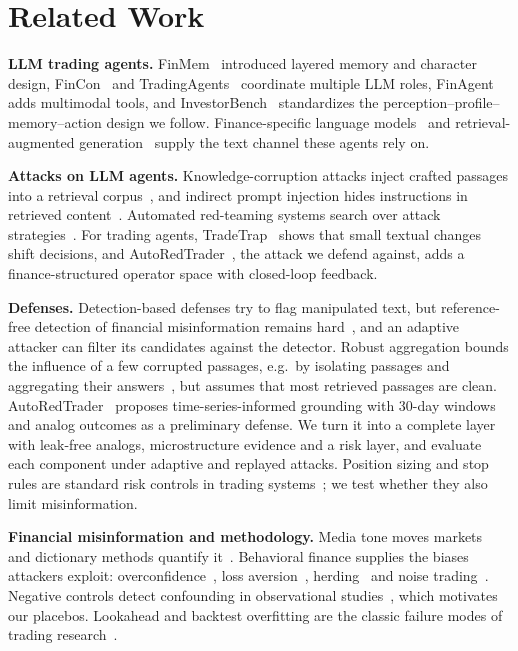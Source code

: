 \section{Related Work}\label{sec:related}
\textbf{LLM trading agents.} FinMem~\cite{yu2025finmem} introduced layered memory and character design, FinCon~\cite{yu2024fincon} and TradingAgents~\cite{xiao2025tradingagents} coordinate multiple LLM roles, FinAgent~\cite{zhang2024finagent} adds multimodal tools, and InvestorBench~\cite{li2025investorbench} standardizes the perception--profile--memory--action design we follow. Finance-specific language models~\cite{araci2019finbert,wu2023bloomberggpt} and retrieval-augmented generation~\cite{lewis2020rag} supply the text channel these agents rely on.

\textbf{Attacks on LLM agents.} Knowledge-corruption attacks inject crafted passages into a retrieval corpus~\cite{zou2025poisonedrag}, and indirect prompt injection hides instructions in retrieved content~\cite{greshake2023indirect}. Automated red-teaming systems search over attack strategies~\cite{zhou2025autoredteamer,jiang2024artprompt}. For trading agents, TradeTrap~\cite{yan2025tradetrap} shows that small textual changes shift decisions, and AutoRedTrader~\cite{liu2026autoredtrader}, the attack we defend against, adds a finance-structured operator space with closed-loop feedback.

\textbf{Defenses.} Detection-based defenses try to flag manipulated text, but reference-free detection of financial misinformation remains hard~\cite{jiang2026glisters,wang2026life}, and an adaptive attacker can filter its candidates against the detector. Robust aggregation bounds the influence of a few corrupted passages, e.g.\ by isolating passages and aggregating their answers~\cite{xiang2024robustrag}, but assumes that most retrieved passages are clean. AutoRedTrader~\cite{liu2026autoredtrader} proposes time-series-informed grounding with 30-day windows and analog outcomes as a preliminary defense. We turn it into a complete layer with leak-free analogs, microstructure evidence and a risk layer, and evaluate each component under adaptive and replayed attacks. Position sizing and stop rules are standard risk controls in trading systems~\cite{lopezdeprado2018advances}; we test whether they also limit misinformation.

\textbf{Financial misinformation and methodology.} Media tone moves markets~\cite{tetlock2007giving} and dictionary methods quantify it~\cite{loughran2011liability}. Behavioral finance supplies the biases attackers exploit: overconfidence~\cite{barber2001boys}, loss aversion~\cite{kahneman1979prospect}, herding~\cite{spyrou2013herding} and noise trading~\cite{delong1990noise}. Negative controls detect confounding in observational studies~\cite{lipsitch2010negative}, which motivates our placebos. Lookahead and backtest overfitting are the classic failure modes of trading research~\cite{lopezdeprado2018advances,bailey2014probability}.
